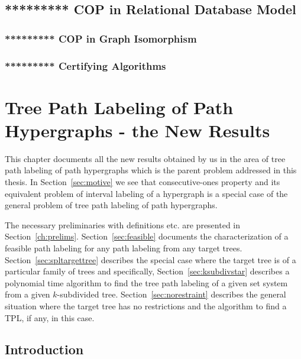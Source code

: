 \documentclass[MS]             %
              {iitmdiss_as}    %
\begin{document}
\section{********* COP in Relational Database Model}
\label{sec:surveyrdbm}

\subsection{********* COP in Graph Isomorphism}
\label{sec:surveygraphiso}

\subsection{********* Certifying Algorithms}
\label{sec:surveycertalgo}


\chapter{Tree Path Labeling of Path Hypergraphs - the New Results}
\label{ch:myresearch}

  This chapter documents all the new results obtained by us in the
area of tree path labeling of path hypergraphs which is the parent
problem addressed in this thesis. In Section~\ref{sec:motive} we see
that consecutive-ones property and its equivalent problem of interval
labeling of a hypergraph is a special case of the general problem of tree
path labeling of path hypergraphs.


The necessary
preliminaries with definitions etc. are presented in
Section~\ref{ch:prelims}. Section~\ref{sec:feasible} documents the
characterization of a feasible path labeling for any path labeling
from any target trees. Section~\ref{sec:spltargettree} describes the
special case where the target tree is of a particular family of trees
and specifically, Section~\ref{sec:ksubdivstar} describes a polynomial
time algorithm to find the tree path labeling of a given set system
from a given $k$-subdivided tree. Section~\ref{sec:norestraint}
describes the general situation where the target tree has no
restrictions and the algorithm to find a TPL, if any, in this case.


\section{Introduction} 
\end{document}
